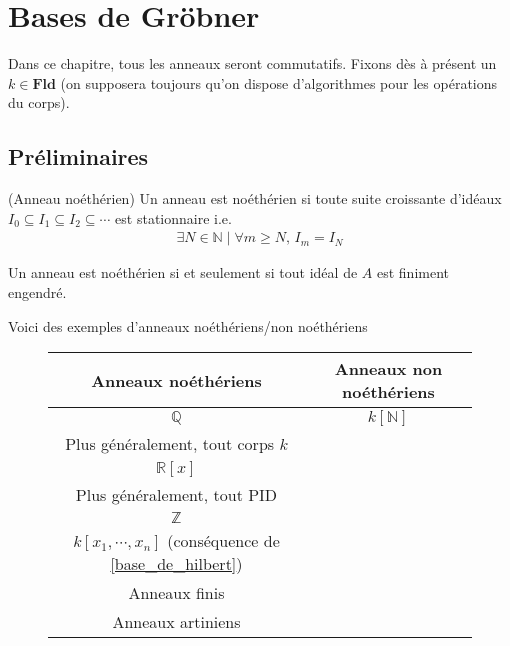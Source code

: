 \chapter{Bases de Gröbner}
    Dans ce chapitre, tous les anneaux seront commutatifs. Fixons dès à présent un $k \in \mathbf{Fld}$ (on supposera toujours qu'on dispose d'algorithmes pour les opérations du corps). 
    \section{Préliminaires}
        \begin{defi} (Anneau noéthérien)
            Un anneau est noéthérien si toute suite croissante d'idéaux $I_0 \subseteq I_1 \subseteq I_2 \subseteq \cdots$ est stationnaire i.e. 
            \begin{align*}
                \exists N \in \mathbb{N} \mid \forall m \geq N,\, I_m = I_N 
            \end{align*}
        \end{defi}
        \begin{prop}
            Un anneau est noéthérien si et seulement si tout idéal de $A$ est finiment engendré. 
        \end{prop}
        \begin{expl}
            Voici des exemples d'anneaux noéthériens/non noéthériens
            \begin{figure}[H]
                \centering
                \begin{tabular}{c|c}
                    Anneaux noéthériens & Anneaux non noéthériens \\
                    \hline
                    $\mathbb{Q}$ & $k[\mathbb{N}]$ \\
                    Plus généralement, tout corps $k$ & \\
                    $\mathbb{R}[x]$ & \\
                    Plus généralement, tout PID & \\
                    $\mathbb{Z}$ & \\
                    $k[x_1, \cdots, x_n]$ (conséquence de \ref{base_de_hilbert}) & \\
                    Anneaux finis & \\
                    Anneaux artiniens & \\
                \end{tabular}
            \end{figure}
        \end{expl}
